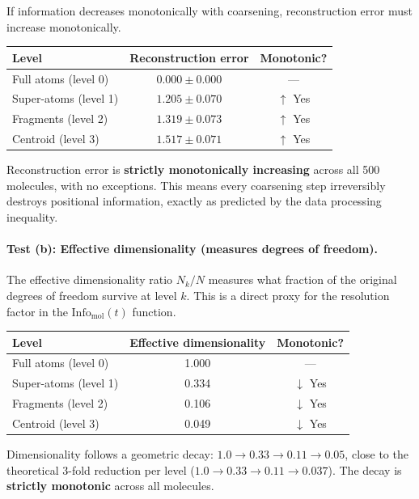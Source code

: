 \documentclass[12pt,a4paper]{article}
\begin{document}
If information decreases monotonically with coarsening, reconstruction error must increase monotonically.

\begin{validationbox}
\begin{center}
\begin{tabular}{lcc}
\toprule
\textbf{Level} & \textbf{Reconstruction error} & \textbf{Monotonic?} \\
\midrule
Full atoms (level 0) & $0.000 \pm 0.000$ & --- \\
Super-atoms (level 1) & $1.205 \pm 0.070$ & $\uparrow$ Yes \\
Fragments (level 2) & $1.319 \pm 0.073$ & $\uparrow$ Yes \\
Centroid (level 3) & $1.517 \pm 0.071$ & $\uparrow$ Yes \\
\bottomrule
\end{tabular}
\end{center}
Reconstruction error is \textbf{strictly monotonically increasing} across all 500 molecules, with no exceptions. This means every coarsening step irreversibly destroys positional information, exactly as predicted by the data processing inequality.
\end{validationbox}

\paragraph{Test (b): Effective dimensionality (measures degrees of freedom).}
The effective dimensionality ratio $N_k / N$ measures what fraction of the original degrees of freedom survive at level $k$. This is a direct proxy for the resolution factor in the $\text{Info}_{\text{mol}}(t)$ function.

\begin{validationbox}
\begin{center}
\begin{tabular}{lcc}
\toprule
\textbf{Level} & \textbf{Effective dimensionality} & \textbf{Monotonic?} \\
\midrule
Full atoms (level 0) & 1.000 & --- \\
Super-atoms (level 1) & 0.334 & $\downarrow$ Yes \\
Fragments (level 2) & 0.106 & $\downarrow$ Yes \\
Centroid (level 3) & 0.049 & $\downarrow$ Yes \\
\bottomrule
\end{tabular}
\end{center}
Dimensionality follows a geometric decay: $1.0 \to 0.33 \to 0.11 \to 0.05$, close to the theoretical 3-fold reduction per level ($1.0 \to 0.33 \to 0.11 \to 0.037$). The decay is \textbf{strictly monotonic} across all molecules.
\end{validationbox}
\end{document}
